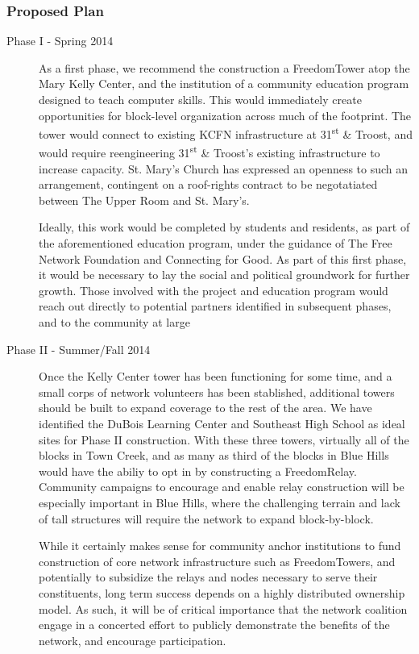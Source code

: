 \subsubsection{Proposed Plan}
\begin{description}
\item[Phase I - Spring 2014] As a first phase, we recommend the construction a FreedomTower atop the Mary Kelly Center, and the institution of a community education program designed to teach computer skills. This would immediately create opportunities for block-level organization across much of the footprint. The tower would connect to existing KCFN infrastructure at 31\textsuperscript{st} \& Troost, and would require reengineering 31\textsuperscript{st} \& Troost's existing infrastructure to increase capacity. St. Mary's Church has expressed an openness to such an arrangement, contingent on a roof-rights contract to be negotatiated between The Upper Room and St. Mary's. \par
Ideally, this work would be completed by students and residents, as part of the aforementioned education program, under the guidance of The Free Network Foundation and Connecting for Good. As part of this first phase, it would be necessary to lay the social and political groundwork for further growth. Those involved with the project and education program would reach out directly to potential partners identified in subsequent phases, and to the community at large \par
\item[Phase II - Summer/Fall 2014] Once the Kelly Center tower has been functioning for some time, and a small corps of network volunteers has been stablished, additional towers should be built to expand coverage to the rest of the area. We have identified the DuBois Learning Center and Southeast High School as ideal sites for Phase II construction. With these three towers, virtually all of the blocks in Town Creek, and as many as third of the blocks in Blue Hills would have the abiliy to opt in by constructing a FreedomRelay. Community campaigns to encourage and enable relay construction will be especially important in Blue Hills, where the challenging terrain and lack of tall structures will require the network to expand block-by-block. \par
While it certainly makes sense for community anchor institutions to fund construction of core network infrastructure such as FreedomTowers, and potentially to subsidize the relays and nodes necessary to serve their constituents, long term success depends on a highly distributed ownership model. As such, it will be of critical importance that the network coalition engage in a concerted effort to publicly demonstrate the benefits of the network, and encourage participation. \par


\end{description}
